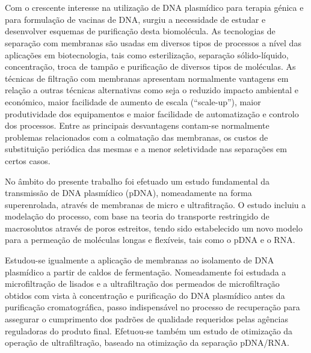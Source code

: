 \documentclass[10pt,twoside]{thesis}
\begin{document}


\onehalfspacing




\pagestyle{fancy}

\cleardoublepage

\newpage 	
\section*{}
\vspace{0.5cm}
Com o crescente interesse na utilização de DNA plasmídico para terapia génica e para formulação de vacinas de DNA, surgiu a necessidade de estudar e desenvolver esquemas de purificação desta biomolécula. As tecnologias de separação com membranas são usadas em diversos tipos de processos a nível das aplicações em biotecnologia, tais como esterilização, separação sólido-líquido, concentração, troca de tampão e purificação de diversos tipos de moléculas. As técnicas de filtração com membranas apresentam normalmente vantagens  em relação a outras técnicas alternativas como seja o reduzido impacto ambiental e económico, maior facilidade de aumento de escala (``scale-up''), maior produtividade dos equipamentos e maior facilidade de automatização e controlo dos processos. Entre as principais desvantagens contam-se normalmente problemas relacionados com a colmatação das membranas, os custos de substituição periódica das mesmas e a menor seletividade nas separações em certos casos.

No âmbito do presente trabalho foi efetuado um estudo fundamental da transmissão de DNA plasmídico (pDNA), nomeadamente na forma superenrolada, através de membranas de micro e ultrafitração. O estudo incluiu a modelação do processo, com base na teoria do transporte restringido de macrosolutos através de poros estreitos, tendo sido estabelecido um novo modelo para a permeação de moléculas longas e flexíveis, tais como o pDNA e o RNA.

Estudou-se igualmente a aplicação de membranas ao isolamento de DNA plasmídico a partir de caldos de fermentação. Nomeadamente foi estudada a microfiltração de lisados e a ultrafiltração dos permeados de microfiltração obtidos com vista à concentração e purificação do DNA plasmídico antes da purificação cromatográfica, passo indispensável no processo de recuperação para assegurar o cumprimento dos padrões de qualidade requeridos pelas agências reguladoras do produto final. Efetuou-se também um estudo de otimização da operação de ultrafiltração, baseado na otimização da separação pDNA/RNA. 
\end{document}

